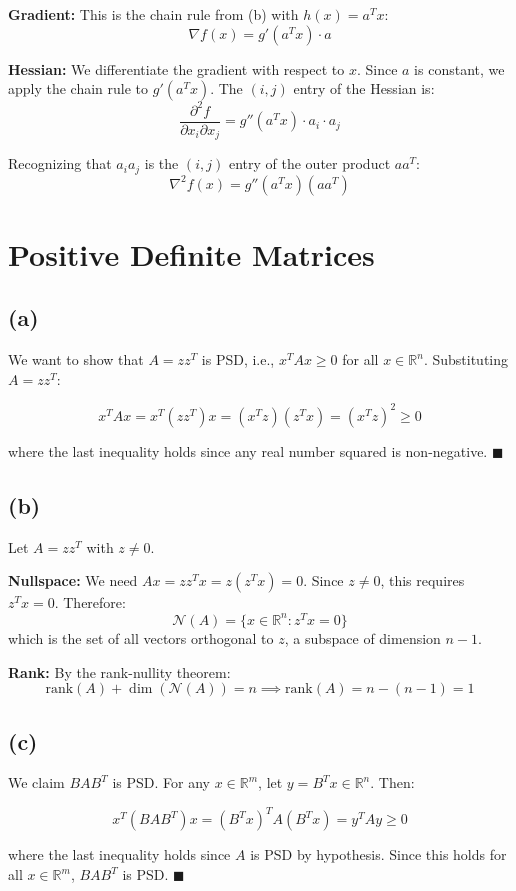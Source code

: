 \documentclass{article}
\begin{document}
\textbf{Gradient:} This is the chain rule from (b) with $h(x) = a^Tx$:
$$\nabla f(x) = g'(a^Tx) \cdot a$$

\textbf{Hessian:} We differentiate the gradient with respect to $x$. 
Since $a$ is constant, we apply the chain rule to $g'(a^Tx)$. 
The $(i,j)$ entry of the Hessian is:
$$\frac{\partial^2 f}{\partial x_i \partial x_j} = g''(a^Tx) \cdot a_i \cdot a_j$$

Recognizing that $a_i a_j$ is the $(i,j)$ entry of the outer product $aa^T$:
$$\nabla^2 f(x) = g''(a^Tx)(aa^T)$$


\section{Positive Definite Matrices}

\subsection*{(a)}
We want to show that $A = zz^T$ is PSD, i.e., $x^TAx \geq 0$ 
for all $x \in \mathbb{R}^n$. Substituting $A = zz^T$:

$$x^TAx = x^T(zz^T)x = (x^Tz)(z^Tx) = (x^Tz)^2 \geq 0$$

where the last inequality holds since any real number squared is 
non-negative. $\blacksquare$

\subsection*{(b)}
Let $A = zz^T$ with $z \neq 0$. 

\textbf{Nullspace:} We need $Ax = zz^Tx = z(z^Tx) = 0$. Since 
$z \neq 0$, this requires $z^Tx = 0$. Therefore:
$$\mathcal{N}(A) = \{x \in \mathbb{R}^n : z^Tx = 0\}$$
which is the set of all vectors orthogonal to $z$, a subspace 
of dimension $n-1$.

\textbf{Rank:} By the rank-nullity theorem:
$$\text{rank}(A) + \dim(\mathcal{N}(A)) = n 
\implies \text{rank}(A) = n - (n-1) = 1$$

\subsection*{(c)}
We claim $BAB^T$ is PSD. For any $x \in \mathbb{R}^m$, 
let $y = B^Tx \in \mathbb{R}^n$. Then:

$$x^T(BAB^T)x = (B^Tx)^T A (B^Tx) = y^TAy \geq 0$$

where the last inequality holds since $A$ is PSD by hypothesis. 
Since this holds for all $x \in \mathbb{R}^m$, $BAB^T$ is PSD. 
$\blacksquare$
\end{document}
